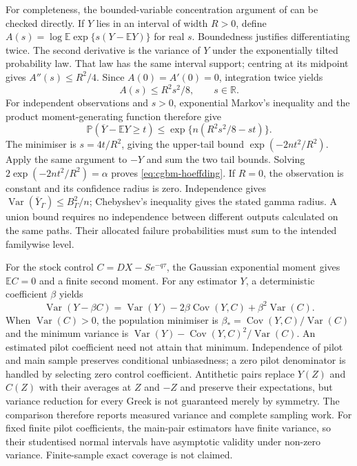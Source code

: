 \documentclass[11pt]{article}
\begin{document}
For completeness, the bounded-variable concentration argument of
\citet{hoeffding1963} can be checked directly. If $Y$ lies in an interval
of width $R>0$, define
$A(s)=\log\mathbb E\exp\{s(Y-\mathbb E Y)\}$ for real $s$.
Boundedness justifies differentiating twice. The second derivative is
the variance of $Y$ under the exponentially tilted probability law.
That law has the same interval support; centring at its midpoint gives
$A''(s)\leq R^2/4$. Since $A(0)=A'(0)=0$, integration twice yields
\begin{equation}
 A(s)\leq R^2s^2/8,\qquad s\in\mathbb R.
 \label{eq:cgbm-hoeffding-mgf}
\end{equation}
For independent observations and $s>0$, exponential Markov's inequality
and the product moment-generating function therefore give
\begin{equation}
 \mathbb P(\overline Y-\mathbb E Y\geq t)
 \leq\exp\{n(R^2s^2/8-st)\}.
 \label{eq:cgbm-hoeffding-chernoff}
\end{equation}
The minimiser is $s=4t/R^2$, giving the upper-tail bound
$\exp(-2nt^2/R^2)$. Apply the same argument to $-Y$ and sum the two
tail bounds. Solving
$2\exp(-2nt^2/R^2)=\alpha$ proves
\eqref{eq:cgbm-hoeffding}. If $R=0$, the observation is constant and
its confidence radius is zero. Independence gives
$\operatorname{Var}(\overline Y_\Gamma)\leq B_\Gamma^2/n$;
Chebyshev's inequality gives the stated gamma radius. A union bound
requires no independence between different outputs calculated on the
same paths. Their allocated failure probabilities must sum to the
intended familywise level.

For the stock control $C=D X-S e^{-q\tau}$, the Gaussian exponential
moment gives $\mathbb E C=0$ and a finite second moment. For any estimator
$Y$, a deterministic coefficient $\beta$ yields
\begin{equation}
 \operatorname{Var}(Y-\beta C)
 =\operatorname{Var}(Y)-2\beta\operatorname{Cov}(Y,C)
 +\beta^2\operatorname{Var}(C).
 \label{eq:cgbm-control-variance}
\end{equation}
When $\operatorname{Var}(C)>0$, the population minimiser is
$\beta_* =\operatorname{Cov}(Y,C)/\operatorname{Var}(C)$ and the
minimum variance is
$\operatorname{Var}(Y)-\operatorname{Cov}(Y,C)^2/
\operatorname{Var}(C)$. An estimated pilot coefficient need not attain
that minimum. Independence of pilot and main sample preserves conditional
unbiasedness; a zero pilot denominator is handled by selecting zero
control coefficient. Antithetic pairs replace $Y(Z)$ and $C(Z)$ with
their averages at $Z$ and $-Z$ and preserve their expectations, but variance
reduction for every Greek is not guaranteed merely by symmetry. The
comparison therefore reports measured variance and complete sampling work.
For fixed finite pilot coefficients, the main-pair estimators have finite
variance, so their studentised normal intervals have asymptotic validity
under non-zero variance. Finite-sample exact coverage is not claimed.
\end{document}
